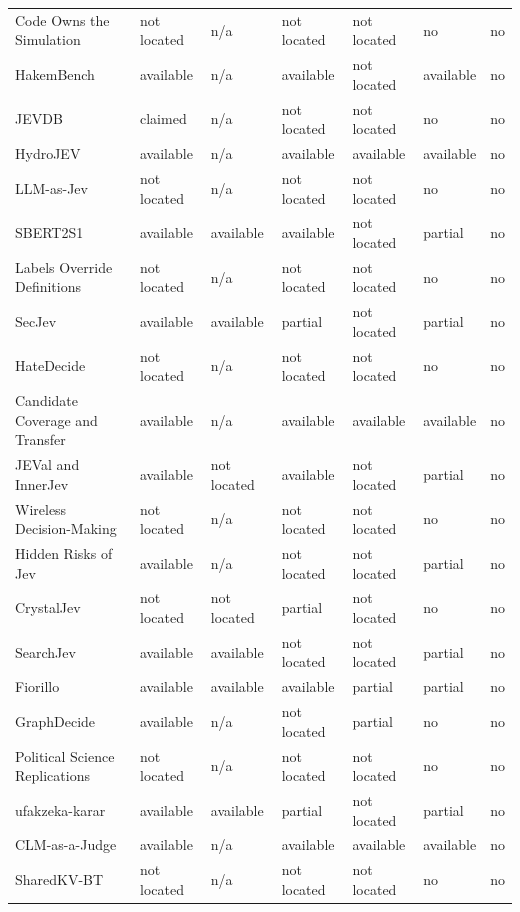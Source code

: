\begin{table}[tbp]
\begin{tabularx}{\linewidth}{Xllllll}
Code Owns the Simulation & not located & n/\allowbreak{}a & not located & not located & no & no \\
HakemBench & available & n/\allowbreak{}a & available & not located & available & no \\
JEVDB & claimed & n/\allowbreak{}a & not located & not located & no & no \\
HydroJEV & available & n/\allowbreak{}a & available & available & available & no \\
LLM-as-Jev & not located & n/\allowbreak{}a & not located & not located & no & no \\
SBERT2S1 & available & available & available & not located & partial & no \\
Labels Override Definitions & not located & n/\allowbreak{}a & not located & not located & no & no \\
SecJev & available & available & partial & not located & partial & no \\
HateDecide & not located & n/\allowbreak{}a & not located & not located & no & no \\
Candidate Coverage and Transfer & available & n/\allowbreak{}a & available & available & available & no \\
JEVal and InnerJev & available & not located & available & not located & partial & no \\
Wireless Decision-Making & not located & n/\allowbreak{}a & not located & not located & no & no \\
Hidden Risks of Jev & available & n/\allowbreak{}a & not located & not located & partial & no \\
CrystalJev & not located & not located & partial & not located & no & no \\
SearchJev & available & available & not located & not located & partial & no \\
Fiorillo & available & available & available & partial & partial & no \\
GraphDecide & available & n/\allowbreak{}a & not located & partial & no & no \\
Political Science Replications & not located & n/\allowbreak{}a & not located & not located & no & no \\
ufakzeka-karar & available & available & partial & not located & partial & no \\
CLM-as-a-Judge & available & n/\allowbreak{}a & available & available & available & no \\
SharedKV-BT & not located & n/\allowbreak{}a & not located & not located & no & no \\

\end{tabularx}
\end{table}
